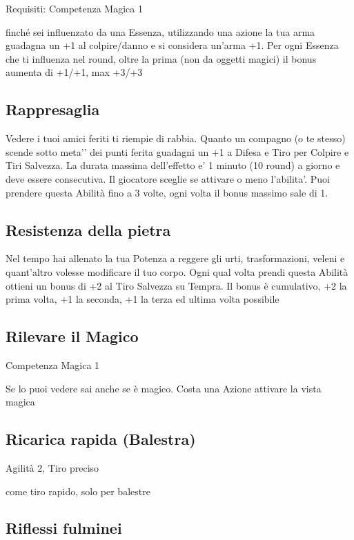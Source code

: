 \documentclass[a4paper,11pt,twoside,openany]{book}
\begin{document}
Requisiti: Competenza Magica 1

finché sei influenzato da una Essenza, utilizzando una azione la tua arma guadagna un +1 al colpire/danno e si considera un'arma +1. Per ogni Essenza che ti influenza nel round, oltre la prima (non da oggetti magici) il bonus aumenta di +1/+1, max +3/+3

\subsection{Rappresaglia}

Vedere i tuoi amici feriti ti riempie di rabbia.
Quanto un compagno (o te stesso) scende sotto meta'’ dei punti ferita guadagni un +1 a Difesa e Tiro per Colpire e Tiri Salvezza. La durata massima dell’effetto e’ 1 minuto (10 round) a giorno e deve essere consecutiva. Il giocatore sceglie se attivare o meno l’abilita’.
Puoi prendere questa Abilità fino a 3 volte, ogni volta il bonus massimo sale di 1.

\subsection{Resistenza della pietra}

Nel tempo hai allenato la tua Potenza a reggere gli urti, trasformazioni, veleni e quant'altro volesse modificare il tuo corpo. Ogni qual volta prendi questa Abilità ottieni un bonus di +2 al Tiro Salvezza su Tempra. Il bonus è cumulativo, +2 la prima volta, +1 la seconda, +1 la terza ed ultima volta possibile

\subsection{Rilevare il Magico}

Competenza Magica 1

Se lo puoi vedere sai anche se è magico. Costa una Azione attivare la vista magica

\subsection{Ricarica rapida (Balestra)}

Agilità 2, Tiro preciso

come tiro rapido, solo per balestre

\subsection{Riflessi fulminei}
\end{document}
